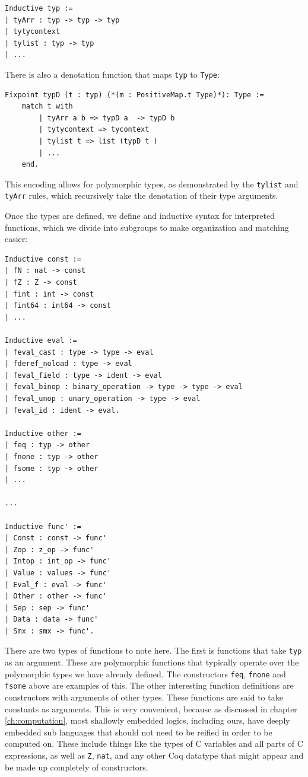 \documentclass{puthesis}
\begin{document}
\begin{lstlisting}
Inductive typ :=
| tyArr : typ -> typ -> typ
| tytycontext
| tylist : typ -> typ
| ...
\end{lstlisting}

There is also a denotation function that maps \lstinline|typ| to
\lstinline|Type|:

\begin{lstlisting} 
Fixpoint typD (t : typ) (*(m : PositiveMap.t Type)*): Type :=
    match t with
        | tyArr a b => typD a  -> typD b
        | tytycontext => tycontext
        | tylist t => list (typD t )
        | ...
    end.
\end{lstlisting}

This encoding allows for polymorphic types, as demonstrated by the
\lstinline|tylist| and \lstinline|tyArr| rules, which recursively take
the denotation of their type arguments.

Once the types are defined, we define and inductive syntax for
interpreted functions, which we divide into subgroups to make
organization and matching easier:

\begin{lstlisting}
Inductive const :=
| fN : nat -> const
| fZ : Z -> const
| fint : int -> const
| fint64 : int64 -> const
| ...

Inductive eval :=
| feval_cast : type -> type -> eval
| fderef_noload : type -> eval
| feval_field : type -> ident -> eval
| feval_binop : binary_operation -> type -> type -> eval
| feval_unop : unary_operation -> type -> eval
| feval_id : ident -> eval.

Inductive other :=
| feq : typ -> other
| fnone : typ -> other
| fsome : typ -> other
| ...

...

Inductive func' :=
| Const : const -> func'
| Zop : z_op -> func'
| Intop : int_op -> func'
| Value : values -> func'
| Eval_f : eval -> func'
| Other : other -> func'
| Sep : sep -> func'
| Data : data -> func'
| Smx : smx -> func'.

\end{lstlisting}

There are two types of functions to note here. The first is functions
that take \lstinline|typ| as an argument. These are polymorphic
functions that typically operate over the polymorphic types we have
already defined. The constructors \lstinline|feq|, \lstinline|fnone|
and \lstinline|fsome| above are examples of this. The other
interesting function definitions are constructors with arguments of
other types. These functions are said to take constants as
arguments. This is very convenient, because as discussed in chapter
\ref{ch:computation}, most shallowly embedded logics, including ours,
have deeply embedded sub languages that should not need to be reified
in order to be computed on. These include things like the types of C
variables and all parts of C expressions, as well as \lstinline|Z|,
\lstinline|nat|, and any other Coq datatype that might appear and be
made up completely of constructors.
\end{document}
